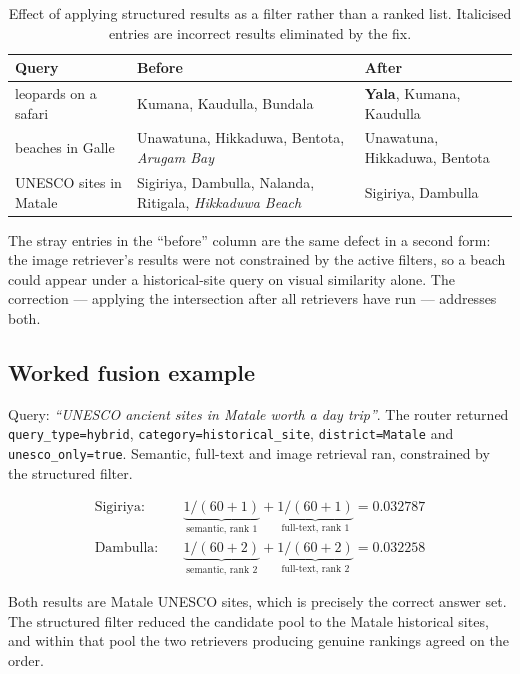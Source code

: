 \documentclass[11pt,a4paper]{article}
\begin{document}
\begin{table}[h]
\centering
\small
\begin{tabular}{p{3.6cm}p{5.3cm}p{4.6cm}}
\toprule
\textbf{Query} & \textbf{Before} & \textbf{After} \\
\midrule
leopards on a safari & Kumana, Kaudulla, Bundala & \textbf{Yala}, Kumana, Kaudulla \\
beaches in Galle & Unawatuna, Hikkaduwa, Bentota, \emph{Arugam Bay} & Unawatuna, Hikkaduwa, Bentota \\
UNESCO sites in Matale & Sigiriya, Dambulla, Nalanda, Ritigala, \emph{Hikkaduwa Beach} & Sigiriya, Dambulla \\
\bottomrule
\end{tabular}
\caption{Effect of applying structured results as a filter rather than a ranked
list. Italicised entries are incorrect results eliminated by the fix.}
\end{table}

The stray entries in the ``before'' column are the same defect in a second form:
the image retriever's results were not constrained by the active filters, so a
beach could appear under a historical-site query on visual similarity alone. The
correction --- applying the intersection after all retrievers have run ---
addresses both.

\subsection{Worked fusion example}

\begin{sloppypar}
Query: \emph{``UNESCO ancient sites in Matale worth a day trip''}. The router
returned \texttt{query\_type=hybrid}, \texttt{category=historical\_site},
\texttt{district=Matale} and \texttt{unesco\_only=true}. Semantic, full-text and
image retrieval ran, constrained by the structured filter.
\end{sloppypar}

\begin{align*}
\text{Sigiriya:} &\quad \underbrace{1/(60+1)}_{\text{semantic, rank 1}}
                    + \underbrace{1/(60+1)}_{\text{full-text, rank 1}}
                    = 0.032787\\
\text{Dambulla:} &\quad \underbrace{1/(60+2)}_{\text{semantic, rank 2}}
                    + \underbrace{1/(60+2)}_{\text{full-text, rank 2}}
                    = 0.032258
\end{align*}

Both results are Matale UNESCO sites, which is precisely the correct answer set.
The structured filter reduced the candidate pool to the Matale historical sites,
and within that pool the two retrievers producing genuine rankings agreed on the
order.
\end{document}
